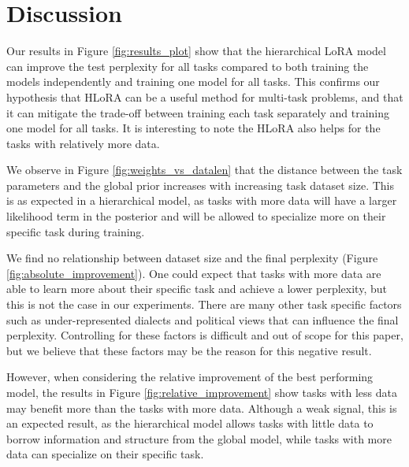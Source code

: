 \documentclass{article}
\begin{document}
\section{Discussion}
Our results in Figure \ref{fig:results_plot} show that the hierarchical LoRA model can improve the test perplexity for all tasks compared to both training the models independently and training one model for all tasks. This confirms our hypothesis that HLoRA can be a useful method for multi-task problems, and that it can mitigate the trade-off between training each task separately and training one model for all tasks.
It is interesting to note the HLoRA also helps for the tasks with relatively more data.

We observe in Figure \ref{fig:weights_vs_datalen} that the distance between the task parameters and the global prior increases with increasing task dataset size. This is as expected in a hierarchical model, as tasks with more data will have a larger likelihood term in the posterior and will be allowed to specialize more on their specific task during training.

We find no relationship between dataset size and the final perplexity (Figure \ref{fig:absolute_improvement}). One could expect that tasks with more data are able to learn more about their specific task and achieve a lower perplexity, but this is not the case in our experiments. There are many other task specific factors such as under-represented dialects and political views that can influence the final perplexity. Controlling for these factors is difficult and out of scope for this paper, but we believe that these factors may be the reason for this negative result.

However, when considering the relative improvement of the best performing model, the results in Figure \ref{fig:relative_improvement} show tasks with less data may benefit more than the tasks with more data. Although a weak signal, this is an expected result, as the hierarchical model allows tasks with little data to borrow information and structure from the global model, while tasks with more data can specialize on their specific task.
\end{document}
